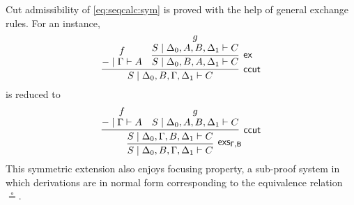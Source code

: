 \documentclass[copyright,creativecommons]{eptcs}
\theoremstyle{definition}
\newcommand{\ex}{\mathsf{ex}}
\begin{document}
Cut admissibility of \ref{eq:seqcalc:sym} is proved with the help of general exchange rules.
For an instance, 
\begin{displaymath}
  \infer[\mathsf{ccut}]{S \mid \Delta_0 ,  B , \Gamma , \Delta_1 \vdash C}{
    \deduce{{-} \mid \Gamma \vdash A}{f}
    &
    \infer[\ex]{S \mid \Delta_0 , B , A , \Delta_1 \vdash C}{
      \deduce{S \mid \Delta_0 , A , B , \Delta_1 \vdash C}{g}
    }
  }
\end{displaymath}
is reduced to 
\begin{displaymath}
  \infer[\mathsf{exs_{\Gamma , B}}]{S \mid \Delta_0 ,  B , \Gamma , \Delta_1 \vdash C}{
    \infer[\mathsf{ccut}]{S \mid \Delta_0 , \Gamma , B , \Delta_1 \vdash C}{
      \deduce{{-} \mid \Gamma \vdash A}{f}
      &
      \deduce{S \mid \Delta_0 , A , B , \Delta_1 \vdash C}{g}
    }
  }
\end{displaymath}
This symmetric extension also enjoys focusing property, a sub-proof system in which derivations are in normal form corresponding to the equivalence relation $\circeq$.
\end{document}
